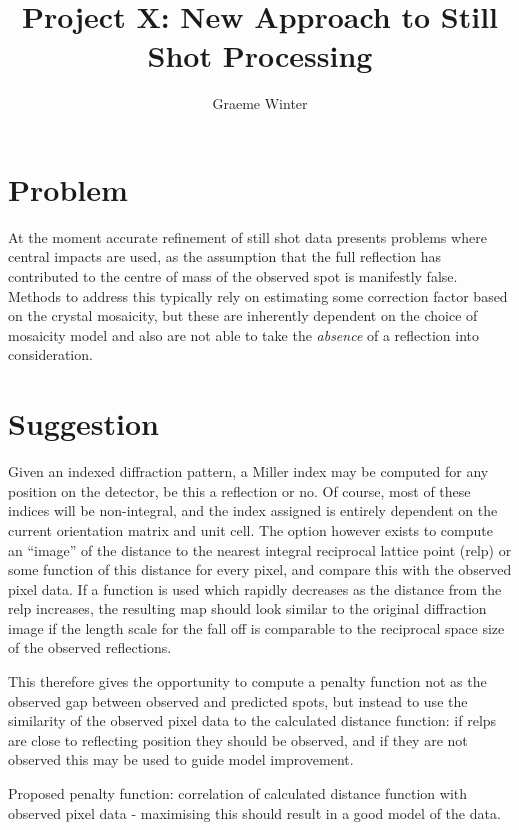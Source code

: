 \documentclass[a4paper, 11pt]{article}
\begin{document}
\title {Project X: New Approach to Still Shot Processing}

\author{Graeme Winter}

\maketitle

\section{Problem}

At the moment accurate refinement of still shot data presents problems where
central impacts are used, as the assumption that the full reflection has 
contributed to the centre of mass of the observed spot is manifestly false.
Methods to address this typically rely on estimating some correction factor
based on the crystal mosaicity, but these are inherently dependent on the 
choice of mosaicity model and also are not able to take the \emph{absence}
of a reflection into consideration.

\section{Suggestion}

Given an indexed diffraction pattern, a Miller index may be computed for any 
position on the detector, be this a reflection or no. Of course, most of these
indices will be non-integral, and the index assigned is entirely dependent on 
the current orientation matrix and unit cell. The option however exists to 
compute an ``image'' of the distance to the nearest integral reciprocal lattice
point (relp) or some function of this distance for every
pixel, and compare this with the observed pixel data. If a function is used
which rapidly decreases as the distance from the relp increases, the resulting 
map should look similar to the original diffraction image if the length scale
for the fall off is comparable to the reciprocal space size of the observed
reflections.

This therefore gives the opportunity to compute a penalty function not as the
observed gap between observed and predicted spots, but instead to use the 
similarity of the observed pixel data to the calculated distance function: if
relps are close to reflecting position they should be observed, and if they are
not observed this may be used to guide model improvement.

Proposed penalty function: correlation of calculated distance function with 
observed pixel data - maximising this should result in a good model of the 
data.
\end{document}
